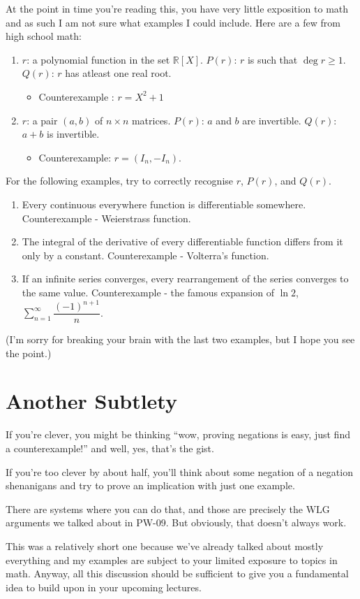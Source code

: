 At the point in time you're reading this, you have very little exposition to math and as such I am not sure what examples I could include. Here are a few from high school math:
\begin{enumerate}
    \item $r$: a polynomial function in the set $\mathbb R[X]$. $P(r)$: $r$ is such that $\deg r \geq 1$. $Q(r)$: $r$ has atleast one real root.
    \begin{itemize}
        \item Counterexample : $r = X^2 + 1$
    \end{itemize}
    \item $r$: a pair $(a, b)$ of $n \times n$ matrices. $P(r)$: $a$ and $b$ are invertible. $Q(r)$: $a + b$ is invertible.
    \begin{itemize}
        \item Counterexample: $r = (I_n, -I_n)$.
    \end{itemize}
\end{enumerate}
For the following examples, try to correctly recognise $r$, $P(r)$, and $Q(r)$.
\begin{enumerate}
    \item Every continuous everywhere function is differentiable somewhere. Counterexample - Weierstrass function.
    \item The integral of the derivative of every differentiable function differs from it only by a constant. Counterexample - Volterra's function.
    \item If an infinite series converges, every rearrangement of the series converges to the same value. Counterexample - the famous expansion of $\ln 2$, $\sum\limits_{n=1} ^\infty \dfrac {(-1)^{n+1}}{n}$.
\end{enumerate}
(I'm sorry for breaking your brain with the last two examples, but I hope you see the point.)

\section*{Another Subtlety}
If you're clever, you might be thinking ``wow, proving negations is easy, just find a counterexample!'' and well, yes, that's the gist.

If you're too clever by about half, you'll think about some negation of a negation shenanigans and try to prove an implication with just one example.

There are systems where you can do that, and those are precisely the $\text{WLG}$ arguments we talked about in PW-09. But obviously, that doesn't always work.

This was a relatively short one because we've already talked about mostly everything and my examples are subject to your limited exposure to topics in math. Anyway, all this discussion should be sufficient to give you a fundamental idea to build upon in your upcoming lectures.
